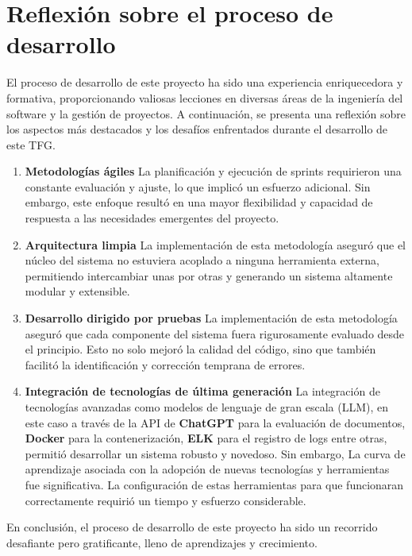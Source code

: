 \section{Reflexión sobre el proceso de desarrollo}

El proceso de desarrollo de este proyecto ha sido una experiencia enriquecedora y formativa, proporcionando valiosas
lecciones en diversas áreas de la ingeniería del software y la gestión de proyectos.
A continuación, se presenta una reflexión sobre los aspectos más destacados y los desafíos enfrentados durante el
desarrollo de este TFG.

\begin{enumerate}
    \item \textbf{Metodologías ágiles}
    La planificación y ejecución de sprints requirieron una constante evaluación y ajuste, lo que implicó un esfuerzo
    adicional.
    Sin embargo, este enfoque resultó en una mayor flexibilidad y capacidad de respuesta a las necesidades emergentes
    del proyecto.
    \item \textbf{Arquitectura limpia}
    La implementación de esta metodología aseguró que el núcleo del sistema no estuviera acoplado a ninguna
    herramienta externa, permitiendo intercambiar unas por otras y generando un sistema altamente modular y extensible.
    \item \textbf{Desarrollo dirigido por pruebas}
    La implementación de esta metodología aseguró que cada componente del sistema fuera rigurosamente evaluado desde el
    principio.
    Esto no solo mejoró la calidad del código, sino que también facilitó la identificación y corrección temprana de
    errores.
    \item \textbf{Integración de tecnologías de última generación}
    La integración de tecnologías avanzadas como modelos de lenguaje de gran escala (LLM), en este caso a través de
    la API de \textbf{ChatGPT} para la evaluación de documentos, \textbf{Docker} para la contenerización, \textbf{ELK}
    para el registro de logs entre otras, permitió desarrollar un sistema robusto y novedoso.
    Sin embargo, La curva de aprendizaje asociada con la adopción de nuevas tecnologías y herramientas fue
    significativa.
    La configuración de estas herramientas para que funcionaran correctamente requirió un tiempo y esfuerzo
    considerable.
\end{enumerate}

En conclusión, el proceso de desarrollo de este proyecto ha sido un recorrido desafiante pero gratificante, lleno de
aprendizajes y crecimiento.
